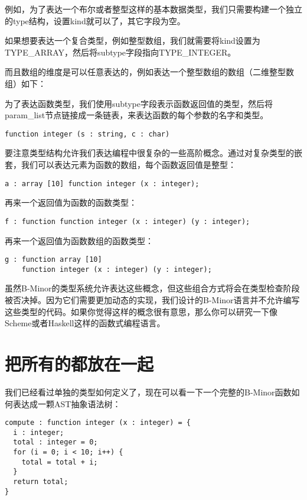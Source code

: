 \documentclass[cn,11pt,chinese]{elegantbook}
\begin{document}
例如，为了表达一个布尔或者整型这样的基本数据类型，我们只需要构建一个独立的type结构，设置kind就可以了，其它字段为空。

如果想要表达一个复合类型，例如整型数组，我们就需要将kind设置为TYPE\_ARRAY，然后将subtype字段指向TYPE\_INTEGER。

而且数组的维度是可以任意表达的，例如表达一个整型数组的数组（二维整型数组）如下：

为了表达函数类型，我们使用subtype字段表示函数返回值的类型，然后将param\_list节点链接成一条链表，来表达函数的每个参数的名字和类型。

\begin{verbatim}
function integer (s : string, c : char)
\end{verbatim}

要注意类型结构允许我们表达编程中很复杂的一些高阶概念。通过对复杂类型的嵌套，我们可以表达元素为函数的数组，每个函数返回值是整型：

\begin{verbatim}
a : array [10] function integer (x : integer);
\end{verbatim}

再来一个返回值为函数的函数类型：

\begin{verbatim}
f : function function integer (x : integer) (y : integer);
\end{verbatim}

再来一个返回值为函数数组的函数类型：

\begin{verbatim}
g : function array [10]
    function integer (x : integer) (y : integer);
\end{verbatim}

虽然B-Minor的类型系统允许表达这些概念，但这些组合方式将会在类型检查阶段被否决掉。因为它们需要更加动态的实现，我们设计的B-Minor语言并不允许编写这些类型的代码。如果你觉得这样的概念很有意思，那么你可以研究一下像Scheme或者Haskell这样的函数式编程语言。

\section{把所有的都放在一起}

我们已经看过单独的类型如何定义了，现在可以看一下一个完整的B-Minor函数如何表达成一颗AST抽象语法树：

\begin{verbatim}
compute : function integer (x : integer) = {
  i : integer;
  total : integer = 0;
  for (i = 0; i < 10; i++) {
    total = total + i;
  }
  return total;
}
\end{verbatim}
\end{document}
